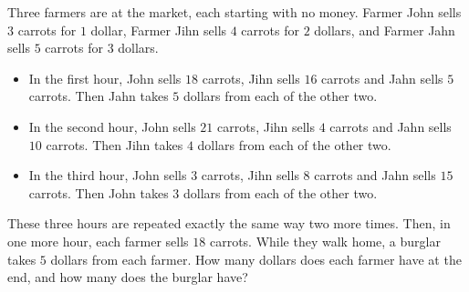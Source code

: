 Three farmers are at the market, each starting with no money. Farmer John sells $3$ carrots for $1$ dollar, Farmer Jihn sells $4$ carrots for $2$ dollars, and Farmer Jahn sells $5$ carrots for $3$ dollars.
\begin{itemize}
\item In the first hour, John sells $18$ carrots, Jihn sells $16$ carrots and Jahn sells $5$ carrots. Then Jahn takes $5$ dollars from each of the other two.
\item In the second hour, John sells $21$ carrots, Jihn sells $4$ carrots and Jahn sells $10$ carrots. Then Jihn takes $4$ dollars from each of the other two.
\item In the third hour, John sells $3$ carrots, Jihn sells $8$ carrots and Jahn sells $15$ carrots. Then John takes $3$ dollars from each of the other two.
\end{itemize}
These three hours are repeated exactly the same way two more times. Then, in one more hour, each farmer sells $18$ carrots. While they walk home, a burglar takes $5$ dollars from each farmer. How many dollars does each farmer have at the end, and how many does the burglar have?
